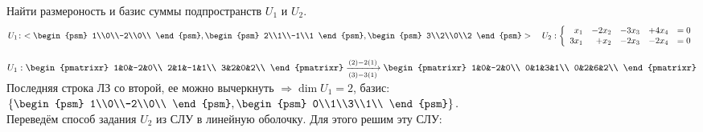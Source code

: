 \begin{prim}
Найти размероность и базис суммы подпространств $U_1$ и $U_2$.
$$
U_1\!:~<
\begin{psm}
1\\0\\-2\\0\\
\end{psm}
,
\begin{psm}
2\\1\\-1\\1
\end{psm}
,
\begin{psm}
3\\2\\0\\2
\end{psm}
>
\quad
U_2:
\left\{
\begin{array}{rrrrl}
x_1&-2x_2&-3x_3&+4x_4&=0\\
3x_1&+x_2&-2x_3&-2x_4&=0\\
\end{array}
\right.
$$
\end{prim}
$
U_1:
\begin{pmatrixr}
1&0&-2&0\\
2&1&-1&1\\
3&2&0&2\\
\end{pmatrixr}
\xrightarrow[(3)-3(1)]{(2)-2(1)}
\begin{pmatrixr}
1&0&-2&0\\
0&1&3&1\\
0&2&6&2\\
\end{pmatrixr}
$\\
Последняя строка ЛЗ со второй, ее можно вычеркнуть $\Rightarrow \dim U_1 = 2$, базис:
$\left\{
\begin{psm}
1\\0\\-2\\0\\
\end{psm}
,
\begin{psm}
0\\1\\3\\1\\
\end{psm}
\right\}.
$\\
Переведём способ задания $U_2$ из СЛУ в линейную оболочку. Для этого решим эту СЛУ:\\
